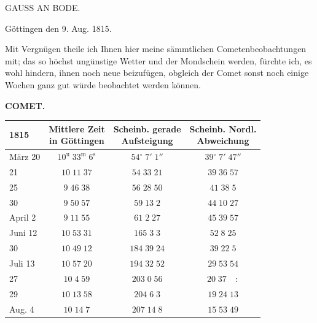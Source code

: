 \par{}\bigskip
\hypertarget{native-392-lower}{}\label{native-392-lower}
\begin{center}
\large GAUSS AN BODE.
\end{center}

\begin{flushright}
Göttingen den 9. Aug. 1815.
\end{flushright}

\par\indent Mit Vergnügen theile ich Ihnen hier meine sämmtlichen Cometenbeobachtungen mit; das so höchst
ungünstige Wetter und der Mondschein werden, fürchte ich, es wohl hindern, ihnen noch neue
beizufügen, obgleich der Comet sonst noch einige Wochen ganz gut würde beobachtet werden können.

\clearpage
\thispagestyle{empty}
\noindent{}%
%
\parbox[t]{\dimexpr\linewidth-24mm\relax}{\centering\footnotesize\bfseries COMET.\par}%
\makebox[12mm][r]{}\par\nobreak\medskip
\begin{center}\fontsize{10}{12}\selectfont\setlength{\tabcolsep}{5pt}\renewcommand{\arraystretch}{1.15}\begin{tabular}{l|c|c|c}
1815 & \shortstack{Mittlere Zeit\\in Göttingen} & \shortstack{Scheinb. gerade\\Aufsteigung} & \shortstack{Scheinb. Nordl.\\Abweichung}\\\hline
März 20 & $10^{\mathrm u}\;33^{\mathrm m}\;6^{\mathrm s}$ & $54^\circ\;7'\;1''$ & $39^\circ\;7'\;47''$\\
21 & $10\;11\;37$ & $54\;33\;21$ & $39\;36\;57$\\
25 & $9\;46\;38$ & $56\;28\;50$ & $41\;38\;5$\\
30 & $9\;50\;57$ & $59\;13\;2$ & $44\;10\;27$\\
April 2 & $9\;11\;55$ & $61\;2\;27$ & $45\;39\;57$\\
Juni 12 & $10\;53\;31$ & $165\;3\;3$ & $52\;8\;25$\\
30 & $10\;49\;12$ & $184\;39\;24$ & $39\;22\;5$\\
Juli 13 & $10\;57\;20$ & $194\;32\;52$ & $29\;53\;54$\\
27 & $10\;4\;59$ & $203\;0\;56$ & $20\;37\quad:$\\
29 & $10\;13\;58$ & $204\;6\;3$ & $19\;24\;13$\\
Aug. 4 & $10\;14\;7$ & $207\;14\;8$ & $15\;53\;49$\\
\end{tabular}\end{center}

